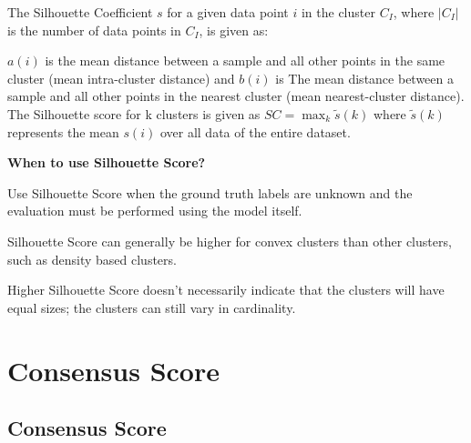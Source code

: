 The Silhouette Coefficient $s$ for a given data point $i$ in the cluster $C_I$, where $|C_I|$ is the number of data points in $C_I$, is given as:

\begin{center}
\end{center}

$a(i)$ is the mean distance between a sample and all other points in the same cluster (mean intra-cluster distance) and $b(i)$ is The mean distance between a sample and all other points in the nearest cluster (mean nearest-cluster distance).
The Silhouette score for k clusters is given as $SC = \max_{k} \tilde{s}(k)$ where $\tilde{s}(k)$ represents the mean $s(i)$ over all data of the entire dataset.

\textbf{When to use Silhouette Score?}

Use Silhouette Score when the ground truth labels are unknown and the evaluation must be performed using the model itself.

{
\item Silhouette Score can generally be higher for convex clusters than other clusters, such as density based clusters.
\item Higher Silhouette Score doesn't necessarily indicate that the clusters will have equal sizes; the clusters can still vary in cardinality. 
}

\clearpage
\thispagestyle{clusteringstyle}
\section{ Consensus Score}
\subsection{ Consensus Score}